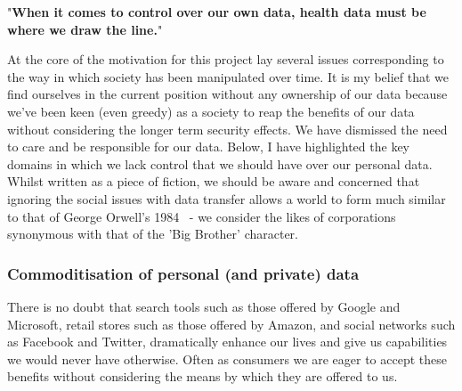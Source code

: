\begin{displayquote}{
  "\textbf{When it comes to control over our own data, health data must be where we draw the line.}"~\autocite{wilbankstopol:2016:article}
}\end{displayquote}






At the core of the motivation for this project lay several issues corresponding to the way in which society has been manipulated over time. It is my belief that we find ourselves in the current position without any ownership of our data because we've been keen (even greedy) as a society to reap the benefits of our data without considering the longer term security effects. We have dismissed the need to care and be responsible for our data. Below, I have highlighted the key domains in which we lack control that we should have over our personal data. Whilst written as a piece of fiction, we should be aware and concerned that ignoring the social issues with data transfer allows a world to form much similar to that of George Orwell's 1984~\autocite{orwell:1984:book} - we consider the likes of corporations synonymous with that of the 'Big Brother' character.

\subsubsection{Commoditisation of personal (and private) data}

There is no doubt that search tools such as those offered by Google and Microsoft, retail stores such as those offered by Amazon, and social networks such as Facebook and Twitter, dramatically enhance our lives and give us capabilities we would never have otherwise. Often as consumers we are eager to accept these benefits without considering the means by which they are offered to us.

